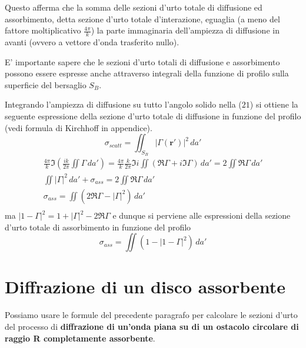 
Questo afferma che la somma delle sezioni d'urto totale di diffusione ed
assorbimento, detta sezione d'urto totale d'interazione, eguaglia (a
meno del fattore moltiplicativo \(\frac{4 \pi}{k}\)) la parte
immaginaria dell'ampiezza di diffusione in avanti (ovvero a vettore
d'onda trasferito nullo).

E' importante sapere che le sezioni d'urto totali di diffusione e
assorbimento possono essere espresse anche attraverso integrali della
funzione di profilo sulla superficie del bersaglio \(S_B\).

Integrando l'ampiezza di diffusione su tutto l'angolo solido nella
(\(21\)) si ottiene la seguente espressione della sezione d'urto totale
di diffusione in funzione del profilo (vedi formula di Kirchhoff in
appendice).
\begin{equation}
	\sigma_{scatt} = \iint_{S_B} |\Gamma(\bm{r}')|^2 \, da'
\end{equation}
\begin{gather*}
	\frac{4 \pi}{k} \Im \left(\frac{ik}{2 \pi} \iint \Gamma \, da' \right) =
	\frac{4 \pi}{k} \frac{k}{2 \pi} \Im i \iint(\Re \Gamma +i \Im \Gamma) \, da' =   2 \iint \Re \Gamma \, da'\\
	\iint |\Gamma|^2 \, da' + \sigma_{ass} = 2 \iint \Re \Gamma \, da'\\
	\sigma_{ass} = \iint (2 \Re \Gamma - |\Gamma|^2) \, da'\\
\end{gather*} ma $|1 - \Gamma|^2 = 1 + |\Gamma|^2 - 2 \Re \Gamma$ e dunque si perviene alle espressioni della sezione d'urto totale di assorbimento in funzione del profilo \begin{equation}
	\boxed{ \sigma_{ass} = \iint \left(1 - |1 - \Gamma|^2 \right) \, da' }
\end{equation}
\section{Diffrazione di un disco assorbente}\label{sec:diffrazione-di-un-disco-assorbente}

Possiamo usare le formule del precedente paragrafo per calcolare le
sezioni d'urto del processo di \textbf{diffrazione di un'onda piana su
di un ostacolo circolare di raggio R completamente assorbente}.


